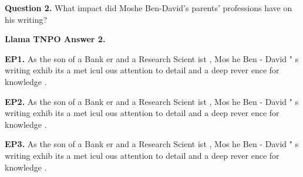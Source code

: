 \begin{mdframed}\small
\textbf{Question 2.}
 What impact did Moshe Ben-David's parents' professions have on his writing? 
\end{mdframed}


\begin{mdframed}\small
\textbf{Llama TNPO Answer 2.} 

\textbf{EP1.} \textcolor{Gray2}{As} \textcolor{Gray9}{the} \textcolor{Gray8}{son} \textcolor{Gray9}{of} \textcolor{Gray9}{a} \textcolor{Gray6}{Bank} \textcolor{Gray6}{er} \textcolor{Gray9}{and} \textcolor{Gray8}{a} \textcolor{Gray5}{Research} \textcolor{Gray8}{Scient} \textcolor{Gray9}{ist} \textcolor{Gray9}{,} \textcolor{Gray6}{Mos} \textcolor{Gray9}{he} \textcolor{Gray9}{Ben} \textcolor{Gray9}{-} \textcolor{Gray5}{David} \textcolor{Gray8}{"} \textcolor{Gray9}{s} \textcolor{Gray6}{writing} \textcolor{Gray3}{exhib} \textcolor{Gray9}{its} \textcolor{Gray9}{a} \textcolor{Gray4}{met} \textcolor{Gray9}{icul} \textcolor{Gray9}{ous} \textcolor{Gray4}{attention} \textcolor{Gray9}{to} \textcolor{Gray9}{detail} \textcolor{Gray8}{and} \textcolor{Gray9}{a} \textcolor{Gray7}{deep} \textcolor{Gray8}{rever} \textcolor{Gray9}{ence} \textcolor{Gray9}{for} \textcolor{Gray9}{knowledge} \textcolor{Gray7}{.} 

\textbf{EP2.} \textcolor{Gray0}{As} \textcolor{Gray6}{the} \textcolor{Gray8}{son} \textcolor{Gray9}{of} \textcolor{Gray9}{a} \textcolor{Gray2}{Bank} \textcolor{Gray6}{er} \textcolor{Gray9}{and} \textcolor{Gray5}{a} \textcolor{Gray2}{Research} \textcolor{Gray8}{Scient} \textcolor{Gray9}{ist} \textcolor{Gray9}{,} \textcolor{Gray6}{Mos} \textcolor{Gray9}{he} \textcolor{Gray8}{Ben} \textcolor{Gray9}{-} \textcolor{Gray7}{David} \textcolor{Gray6}{"} \textcolor{Gray9}{s} \textcolor{Gray5}{writing} \textcolor{Gray1}{exhib} \textcolor{Gray9}{its} \textcolor{Gray7}{a} \textcolor{Gray2}{met} \textcolor{Gray9}{icul} \textcolor{Gray9}{ous} \textcolor{Gray4}{attention} \textcolor{Gray9}{to} \textcolor{Gray9}{detail} \textcolor{Gray6}{and} \textcolor{Gray7}{a} \textcolor{Gray3}{deep} \textcolor{Gray7}{rever} \textcolor{Gray9}{ence} \textcolor{Gray9}{for} \textcolor{Gray8}{knowledge} \textcolor{Gray6}{.} 

\textbf{EP3.} \textcolor{Gray0}{As} \textcolor{Gray0}{the} \textcolor{Gray0}{son} \textcolor{Gray1}{of} \textcolor{Gray0}{a} \textcolor{Gray0}{Bank} \textcolor{Gray0}{er} \textcolor{Gray0}{and} \textcolor{Gray0}{a} \textcolor{Gray0}{Research} \textcolor{Gray0}{Scient} \textcolor{Gray3}{ist} \textcolor{Gray0}{,} \textcolor{Gray0}{Mos} \textcolor{Gray1}{he} \textcolor{Gray0}{Ben} \textcolor{Gray0}{-} \textcolor{Gray0}{David} \textcolor{Gray0}{"} \textcolor{Gray0}{s} \textcolor{Gray0}{writing} \textcolor{Gray0}{exhib} \textcolor{Gray3}{its} \textcolor{Gray0}{a} \textcolor{Gray0}{met} \textcolor{Gray3}{icul} \textcolor{Gray2}{ous} \textcolor{Gray0}{attention} \textcolor{Gray1}{to} \textcolor{Gray1}{detail} \textcolor{Gray0}{and} \textcolor{Gray0}{a} \textcolor{Gray0}{deep} \textcolor{Gray0}{rever} \textcolor{Gray2}{ence} \textcolor{Gray1}{for} \textcolor{Gray0}{knowledge} \textcolor{Gray0}{.} 


\end{mdframed}
